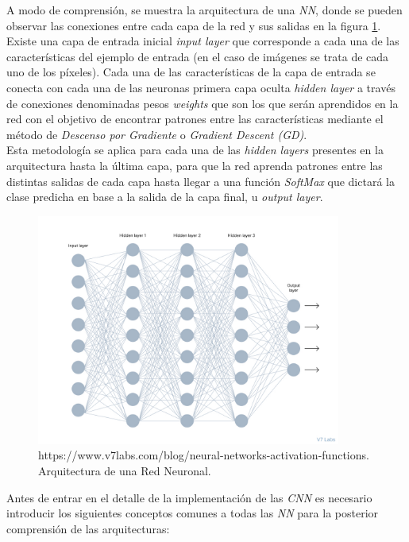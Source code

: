             A modo de comprensión, se muestra la arquitectura de una \textit{NN}, donde se pueden observar las conexiones entre cada capa de la red y sus salidas en la figura \ref{NNImage}. Existe una capa de entrada inicial \textit{input layer} que corresponde a cada una de las características del ejemplo de entrada (en el caso de imágenes se trata de cada uno de los píxeles). Cada una de las características de la capa de entrada se conecta con cada una de las neuronas primera capa oculta \textit{hidden layer} a través de conexiones denominadas pesos \textit{weights} que son los que serán aprendidos en la red con el objetivo de encontrar patrones entre las características mediante el método de \textit{Descenso por Gradiente} o \textit{Gradient Descent (GD)}.\\


            Esta metodología se aplica para cada una de las \textit{hidden layers} presentes en la arquitectura hasta la última capa, para que la red aprenda patrones entre las distintas salidas de cada capa hasta llegar a una función \textit{SoftMax} que dictará la clase predicha en base a la salida de la capa final, u \textit{output layer}.\\

            \begin{figure}[h]
                \centering
                \includegraphics[width=10cm]{archivos/NNImage}
                \caption{https://www.v7labs.com/blog/neural-networks-activation-functions. Arquitectura de una Red Neuronal.}
                \label{NNImage}
             \end{figure}



            Antes de entrar en el detalle de la implementación de las \textit{CNN} es necesario introducir los siguientes conceptos comunes a todas las \textit{NN} para la posterior comprensión de las arquitecturas:


